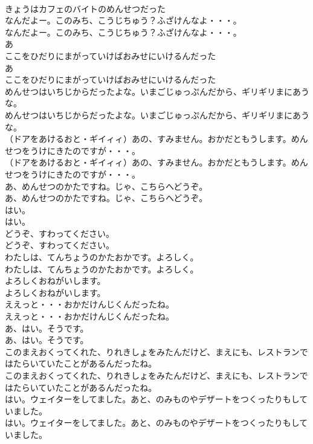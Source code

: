 \documentclass[8pt]{extreport}
\begin{document}
\begin{CJK}{UTF8}{min}
\\	きょうはカフェのバイトのめんせつだった
\\	なんだよー。このみち、こうじちゅう？ふざけんなよ・・・。
\\	なんだよー。このみち、こうじちゅう？ふざけんなよ・・・。
\\	あ
\\	ここをひだりにまがっていけばおみせにいけるんだった
\\	あ
\\	ここをひだりにまがっていけばおみせにいけるんだった
\\	めんせつはいちじからだったよな。いまごじゅっぷんだから、ギリギリまにあうな。
\\	めんせつはいちじからだったよな。いまごじゅっぷんだから、ギリギリまにあうな。
\\	（ドアをあけるおと・ギイィィ）あの、すみません。おかだともうします。めんせつをうけにきたのですが・・・。
\\	（ドアをあけるおと・ギイィィ）あの、すみません。おかだともうします。めんせつをうけにきたのですが・・・。
\\	あ、めんせつのかたですね。じゃ、こちらへどうぞ。
\\	あ、めんせつのかたですね。じゃ、こちらへどうぞ。
\\	はい。
\\	はい。
\\	どうぞ、すわってください。
\\	どうぞ、すわってください。
\\	わたしは、てんちょうのかたおかです。よろしく。
\\	わたしは、てんちょうのかたおかです。よろしく。
\\	よろしくおねがいします。
\\	よろしくおねがいします。
\\	ええっと・・・おかだけんじくんだったね。
\\	ええっと・・・おかだけんじくんだったね。
\\	あ、はい。そうです。
\\	あ、はい。そうです。
\\	このまえおくってくれた、りれきしょをみたんだけど、まえにも、レストランではたらいていたことがあるんだったね。
\\	このまえおくってくれた、りれきしょをみたんだけど、まえにも、レストランではたらいていたことがあるんだったね。
\\	はい。ウェイターをしてました。あと、のみものやデザートをつくったりもしていました。
\\	はい。ウェイターをしてました。あと、のみものやデザートをつくったりもしていました。

\end{CJK}
\end{document}

